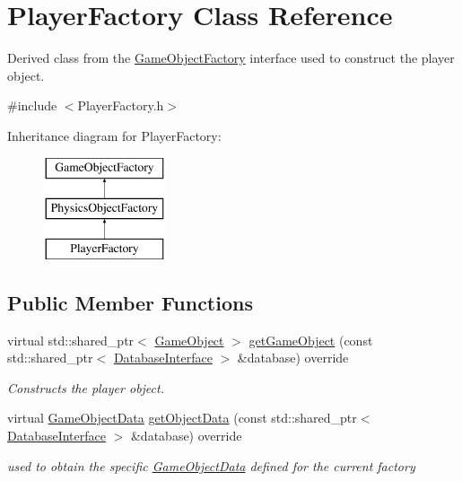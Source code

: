 \hypertarget{class_player_factory}{}\section{Player\+Factory Class Reference}
\label{class_player_factory}


Derived class from the \hyperlink{class_game_object_factory}{Game\+Object\+Factory} interface used to construct the player object.  




{\ttfamily \#include $<$Player\+Factory.\+h$>$}

Inheritance diagram for Player\+Factory\+:\begin{figure}[H]
\begin{center}
\leavevmode
\includegraphics[height=3.000000cm]{df/dda/class_player_factory}
\end{center}
\end{figure}
\subsection*{Public Member Functions}
\begin{DoxyCompactItemize}
\item 
virtual std\+::shared\+\_\+ptr$<$ \hyperlink{class_game_object}{Game\+Object} $>$ \hyperlink{class_player_factory_ab92534e7d2d6887ecf9e4ed8131a8112}{get\+Game\+Object} (const std\+::shared\+\_\+ptr$<$ \hyperlink{class_database_interface}{Database\+Interface} $>$ \&database) override
\begin{DoxyCompactList}\small\item\em Constructs the player object. \end{DoxyCompactList}\item 
virtual \hyperlink{struct_game_object_data}{Game\+Object\+Data} \hyperlink{class_player_factory_aca4e809430541d77acd4c588c4381715}{get\+Object\+Data} (const std\+::shared\+\_\+ptr$<$ \hyperlink{class_database_interface}{Database\+Interface} $>$ \&database) override
\begin{DoxyCompactList}\small\item\em used to obtain the specific \hyperlink{struct_game_object_data}{Game\+Object\+Data} defined for the current factory \end{DoxyCompactList}\end{DoxyCompactItemize}



